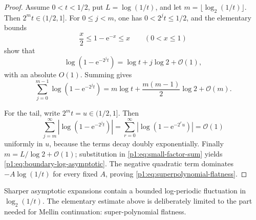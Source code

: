 \documentclass[11pt,oneside]{article}
\numberwithin{equation}{section}
\theoremstyle{definition}
\theoremstyle{remark}
\newcommand{\e}{\mathrm e}
\newcommand{\bigO}{\mathcal O}
\begin{document}
\begin{proof}
Assume \(0<t<1/2\), put \(L=\log(1/t)\), and let
\(m=\lfloor\log_2(1/t)\rfloor\).  Then
\(2^mt\in(1/2,1]\).  For \(0\le j<m\), one has \(0<2^jt\le1/2\), and the
elementary bounds
\begin{equation}
  \frac{x}{2}\le1-\e^{-x}\le x
  \qquad(0<x\le1)
  \label{p1:eq:one-minus-exp-bounds}
\end{equation}
show that
\begin{equation}
  \log(1-\e^{-2^jt})=\log t+j\log2+\bigO(1),
  \label{p1:eq:small-factor-log}
\end{equation}
with an absolute \(O(1)\).  Summing gives
\begin{equation}
 \sum_{j=0}^{m-1}\log(1-\e^{-2^jt})
 =m\log t+\frac{m(m-1)}2\log2+\bigO(m).
 \label{p1:eq:small-factor-sum}
\end{equation}

For the tail, write \(2^mt=u\in(1/2,1]\).  Then
\begin{equation}
 \sum_{j=m}^{\infty}\left|\log(1-\e^{-2^jt})\right|
 =\sum_{r=0}^{\infty}\left|\log(1-\e^{-2^ru})\right|=\bigO(1)
 \label{p1:eq:tail-uniform}
\end{equation}
uniformly in \(u\), because the terms decay doubly exponentially.  Finally
\(m=L/\log2+\bigO(1)\); substitution in
\eqref{p1:eq:small-factor-sum} yields
\eqref{p1:eq:boundary-log-asymptotic}.  The negative quadratic term dominates
\(-A\log(1/t)\) for every fixed \(A\), proving
\eqref{p1:eq:superpolynomial-flatness}.
\end{proof}

\begin{remark}
Sharper asymptotic expansions contain a bounded log-periodic fluctuation in
\(\log_2(1/t)\).  The elementary estimate above is deliberately limited to the
part needed for Mellin continuation: super-polynomial flatness.
\end{remark}
\end{document}
